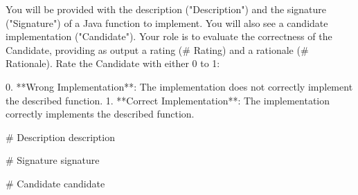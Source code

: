 You will be provided with the description ("Description") and the signature ("Signature") of a Java function to implement. You will also see a candidate implementation ("Candidate"). Your role is to evaluate the correctness of the Candidate, providing as output a rating (# Rating) and a rationale (# Rationale). Rate the Candidate with either 0 to 1:

0. **Wrong Implementation**: The implementation does not correctly implement the described function.
1. **Correct Implementation**: The implementation correctly implements the described function.

# Description
{description}

# Signature
{signature}

# Candidate
{candidate}